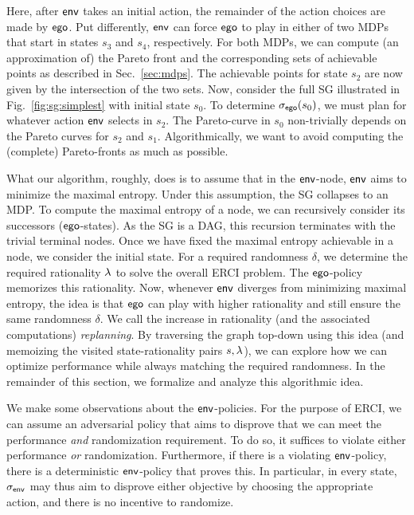 \color{black}
Here, after $\mathsf{env}$ takes an initial action, the remainder of the action choices are made by $\mathsf{ego}$. Put differently, $\mathsf{env}$ can force $\mathsf{ego}$ to play in either of two MDPs that start in states $s_3$ and $s_4$, respectively.
For both MDPs, we can compute (an approximation of) the Pareto front and the corresponding sets of achievable points as described in Sec.~\ref{sec:mdps}. 
The achievable points for state $s_2$ are now given by the intersection of the two sets.
Now, consider the full SG illustrated in Fig.~\ref{fig:sg:simplest} with initial state $s_0$. 
To determine ${\sigma_{\mathsf{ego}}}(s_0)$, we must plan for whatever action $\mathsf{env}$ selects in $s_2$. The Pareto-curve in $s_0$ non-trivially depends on the Pareto curves for $s_2$ and $s_1$. Algorithmically, we want to avoid computing the (complete) Pareto-fronts as much as possible.
 
What our algorithm, roughly, does is to assume that in the $\mathsf{env}$-node, $\mathsf{env}$ aims to minimize the maximal entropy. Under this assumption, the SG collapses to an MDP. To compute the maximal entropy of a node, we can recursively consider its successors ($\mathsf{ego}$-states). As the SG is a DAG, this recursion terminates with the trivial terminal nodes. Once we have fixed the maximal entropy achievable in a node, we consider the initial state. For a required randomness $\delta$, we determine the required rationality $\lambda$ to solve the overall ERCI problem. The $\mathsf{ego}$-policy memorizes this rationality. Now, whenever $\mathsf{env}$ diverges from minimizing maximal entropy, the idea is that $\mathsf{ego}$ can play with higher rationality and still ensure the same randomness $\delta$. We call the increase in rationality (and the associated computations)  \emph{replanning}.
By traversing the graph top-down using this idea (and memoizing the visited state-rationality pairs $s,\lambda$), we can explore how we can optimize performance while always matching the required randomness.  In the remainder of this section, we formalize and analyze this algorithmic idea.

\color{black}
We make some observations about the $\mathsf{env}$-policies. 
For the purpose of ERCI, we can assume an adversarial policy that aims to disprove that we can meet the performance \emph{and} randomization requirement. 
To do so, it suffices to violate either performance \emph{or} randomization. 
Furthermore, if there is a violating $\mathsf{env}$-policy, there is a deterministic $\mathsf{env}$-policy that proves this. 
In particular, in every state,  ${\sigma_{\mathsf{env}}}$ may thus aim to disprove either objective by choosing the appropriate action, and there is no incentive to randomize.

